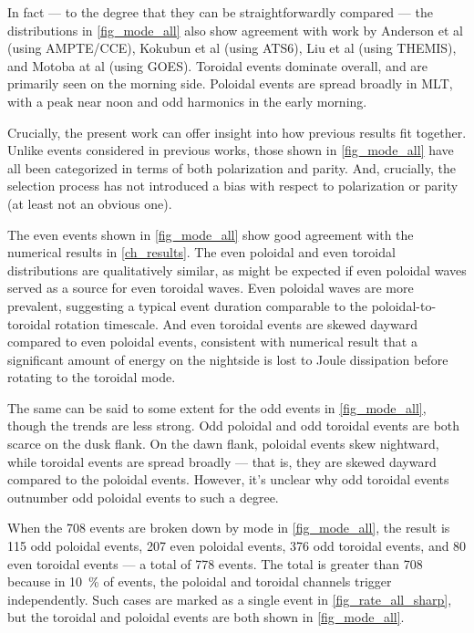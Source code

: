 In fact --- to the degree that they can be straightforwardly compared --- the
distributions in \cref{fig_mode_all} also show agreement with work by
Anderson et al\cite{anderson_1990} (using AMPTE/CCE), Kokubun et 
al\cite{kokubun_1989}
(using ATS6), Liu et al\cite{liu_2009} (using THEMIS), and Motoba at 
al\cite{motoba_2015}
(using GOES). Toroidal events dominate overall, and are primarily seen on the
morning side. Poloidal events are spread broadly in MLT, with a peak near noon
and odd harmonics in the early morning. 

Crucially, the present work can offer insight into how previous results fit
together. Unlike events considered in previous works, those shown in
\cref{fig_mode_all} have all been categorized in terms of both
polarization and parity. And, crucially, the selection process has not
introduced a bias with respect to polarization or parity (at least not an
obvious one). 

The even events shown in \cref{fig_mode_all} show good agreement with the
numerical results in \cref{ch_results}. The even poloidal and even toroidal
distributions are qualitatively similar, as might be expected if even poloidal
waves served as a source for even toroidal waves. Even poloidal waves are more
prevalent, suggesting a typical event duration comparable to the
poloidal-to-toroidal rotation timescale. And even toroidal events are skewed
dayward compared to even poloidal events, consistent with numerical result that
a significant amount of energy on the nightside is lost to Joule dissipation
before rotating to the toroidal mode. 

The same can be said to some extent for the odd events in
\cref{fig_mode_all}, though the trends are less strong. Odd poloidal and
odd toroidal events are both scarce on the dusk flank. On the dawn flank,
poloidal events skew nightward, while toroidal events are spread broadly ---
that is, they are skewed dayward compared to the poloidal events. However, it's
unclear why odd toroidal events outnumber odd poloidal events to such a degree. 

When the 708 events are broken down by mode in \cref{fig_mode_all}, the
result is 115 odd poloidal events, 207 even poloidal events, 376 odd toroidal
events, and 80 even toroidal events --- a total of 778 events. The total is
greater than 708 because in \about\SI{10}{\percent} of events, the poloidal and
toroidal channels trigger independently. Such cases are marked as a single
event in \cref{fig_rate_all_sharp}, but the toroidal and poloidal events are
both shown in \cref{fig_mode_all}. 

